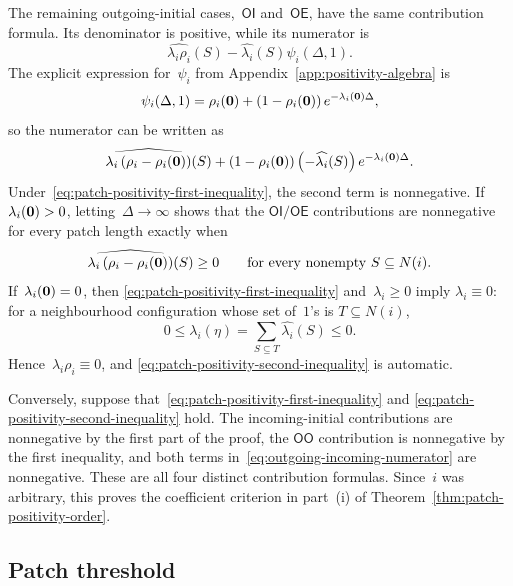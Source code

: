 The remaining outgoing-initial cases,~$\mathsf{OI}$ and~$\mathsf{OE}$, have
the same contribution formula. Its denominator is positive, while its numerator
is
\begin{equation*}
\widehat{\lambda_i\rho_i}(S)
-\widehat{\lambda_i}(S)\psi_i(\Delta,1).
\end{equation*}
The explicit expression for~$\psi_i$ from Appendix~\ref{app:positivity-algebra} is
\begin{equation*}
\psi_i(\Delta,1)
=\rho_i(\mathbf{0})
+\left(1-\rho_i(\mathbf{0})\right)e^{-\lambda_i(\mathbf{0})\Delta},
\end{equation*}
so the numerator can be written as
\begin{equation}
\label{eq:outgoing-incoming-numerator}
\widehat{\lambda_i\left(\rho_i-\rho_i(\mathbf{0})\right)}(S)
+
\left(1-\rho_i(\mathbf{0})\right)
\left(-\widehat{\lambda_i}(S)\right)
e^{-\lambda_i(\mathbf{0})\Delta}.
\end{equation}
Under~\eqref{eq:patch-positivity-first-inequality}, the second term is
nonnegative. If~$\lambda_i(\mathbf{0})>0$, letting~$\Delta\to\infty$ shows that the
$\mathsf{OI}/\mathsf{OE}$ contributions are nonnegative for every patch length
exactly when
\begin{equation}
\label{eq:patch-positivity-second-inequality}
\widehat{\lambda_i\left(\rho_i-\rho_i(\mathbf{0})\right)}(S)\geq0
\qquad\text{for every nonempty }S\subseteq N(i).
\end{equation}
If~$\lambda_i(\mathbf{0})=0$, then
\eqref{eq:patch-positivity-first-inequality} and~$\lambda_i\geq0$ imply
$\lambda_i\equiv0$: for a neighbourhood configuration whose set of~$1$'s is
$T\subseteq N(i)$,
\begin{equation*}
0\leq\lambda_i(\eta)
=\sum_{S\subseteq T}\widehat{\lambda_i}(S)
\leq0.
\end{equation*}
Hence~$\lambda_i\rho_i\equiv0$, and
\eqref{eq:patch-positivity-second-inequality} is automatic.

Conversely, suppose that~\eqref{eq:patch-positivity-first-inequality} and
\eqref{eq:patch-positivity-second-inequality} hold. The incoming-initial
contributions are nonnegative by the first part of the proof, the
$\mathsf{OO}$ contribution is nonnegative by the first inequality, and both
terms in~\eqref{eq:outgoing-incoming-numerator} are nonnegative. These are all
four distinct contribution formulas. Since~$i$ was arbitrary, this proves the
coefficient criterion in part~\textup{(i)} of
Theorem~\ref{thm:patch-positivity-order}.

\subsection{Patch threshold}
\label{subsec:critical-density}

